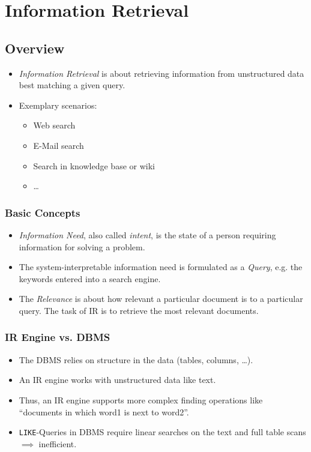 \chapter{Information Retrieval} %
	\section{Overview} %
		\begin{itemize}
			\item \textit{Information Retrieval} is about retrieving information from unstructured data best matching a given query.
			\item Exemplary scenarios:
				\begin{itemize}
					\item Web search
					\item E-Mail search
					\item Search in knowledge base or wiki
					\item \dots
				\end{itemize}
		\end{itemize}

		\subsection{Basic Concepts} %
			\begin{itemize}
				\item \textit{Information Need}, also called \textit{intent}, is the state of a person requiring information for solving a problem.
				\item The system-interpretable information need is formulated as a \textit{Query}, e.g. the keywords entered into a search engine.
				\item The \textit{Relevance} is about how relevant a particular document is to a particular query. The task of IR is to retrieve the most relevant documents.
			\end{itemize}

		\subsection{IR Engine vs. DBMS} %
			\begin{itemize}
				\item The DBMS relies on structure in the data (tables, columns, \dots).
				\item An IR engine works with unstructured data like text.
				\item Thus, an IR engine supports more complex finding operations like \enquote{documents in which word1 is next to word2}.
				\item \lstinline|LIKE|-Queries in DBMS require linear searches on the text and full table scans \(\implies\) inefficient.
			\end{itemize}

